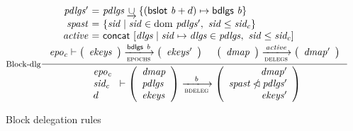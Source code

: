 \begin{figure}
  \begin{equation}
    \label{eq:rule:block-delegation}
    \inference[Block-dlg]
    {
      {\begin{array}{r@{~=~}l}
         \var{pdlgs'} & \var{pdlgs} \unionoverride \{(\bslot{b} + d) \mapsto \bdlgs{b} \}\\
         \var{spast} & \{ \var{sid} \mid \var{sid} \in \var \dom ~ \var{pdlgs'}
                       ,~ \var{sid} \leq \var{sid_c}\}\\
         \var{active} &  \fun{concat}~ [ \var{dlgs} \mid \var{sid} \mapsto \var{dlgs} \in \var{pdlgs}
                                          ,~ \var{sid} \leq \var{sid_c}]
      \end{array}} & \\
      \var{epo_c} \vdash
      {
        \left(
          \begin{array}{l}
            \var{ekeys}
          \end{array}
        \right)
      }
      \trans{epochs}{\bdlgs{b}}
      {
        \left(
          \begin{array}{r}
            \var{ekeys'}
          \end{array}
        \right)
      } & 
      {
        \left(
          \begin{array}{l}
            \var{dmap}
          \end{array}
        \right)
      }
      \trans{delegs}{\var{active}}
      {
        \left(
          \begin{array}{r}
            \var{dmap'}
          \end{array}
        \right)
      }     
    }
    {
      \begin{array}{l}
        \var{epo_c}\\
        \var{sid_c}\\
        d
      \end{array}
      \vdash
      {
        \left(
          \begin{array}{l}
            \var{dmap}\\
            \var{pdlgs}\\
            \var{ekeys}
          \end{array}
        \right)
      }
      \trans{bdeleg}{b}
      {
        \left(
          \begin{array}{r}
            \var{dmap'}\\
            \var{\var{spast} \subtractdom pdlgs'}\\
            \var{ekeys'}
          \end{array}
        \right)
      }
    }
  \end{equation}
  \caption{Block delegation rules}
  \label{fig:rules:block-delegation}
\end{figure}

